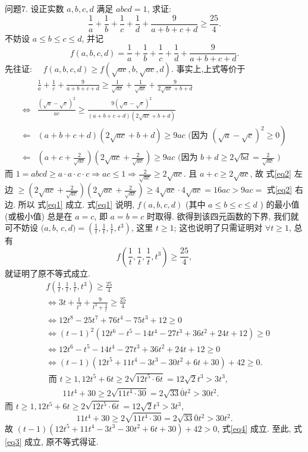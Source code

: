 问题7. 设正实数 $a, b, c, d$ 满足 $a b c d=1$, 求证:
$$
\frac{1}{a}+\frac{1}{b}+\frac{1}{c}+\frac{1}{d}+\frac{9}{a+b+c+d} \geqslant \frac{25}{4} .
$$
不妨设 $a \leqslant b \leqslant c \leqslant d$, 并记
$$
f(a, b, c, d)=\frac{1}{a}+\frac{1}{b}+\frac{1}{c}+\frac{1}{d}+\frac{9}{a+b+c+d} .
$$
先往证: $\quad f(a, b, c, d) \geqslant f(\sqrt{a c}, b, \sqrt{a c}, d)$. \label{eq1}
事实上,上式等价于
$$
\begin{aligned}
& \frac{1}{a}+\frac{1}{c}+\frac{9}{a+b+c+d} \geqslant \frac{1}{\sqrt{a c}}+\frac{1}{\sqrt{a c}}+\frac{9}{2 \sqrt{a c}+b+d} \\
\Leftrightarrow & \frac{(\sqrt{a}-\sqrt{c})^2}{a c} \geqslant \frac{9(\sqrt{a}-\sqrt{c})^2}{(a+b+c+d)(2 \sqrt{a c}+b+d)} \\
\Leftarrow & \left.(a+b+c+d)(2 \sqrt{a c}+b+d) \geqslant 9 a c \text { (因为 }(\sqrt{a}-\sqrt{c})^2 \geqslant 0\right) \\
\Leftarrow & \left(a+c+\frac{2}{\sqrt{a c}}\right)\left(2 \sqrt{a c}+\frac{2}{\sqrt{a c}}\right) \geqslant 9 a c \text { (因为 } b+d \geqslant 2 \sqrt{b d}=\frac{2}{\sqrt{a c}} \text { ) } \label{eq2}
\end{aligned}
$$
而 $1=a b c d \geqslant a \cdot a \cdot c \cdot c \Rightarrow a c \leqslant 1 \Rightarrow \frac{2}{\sqrt{a c}} \geqslant 2 \sqrt{a c}$. 且 $a+c \geqslant 2 \sqrt{a c}$, 故
式\ref{eq2} 左边 $\geqslant\left(2 \sqrt{a c}+\frac{2}{\sqrt{a c}}\right)\left(2 \sqrt{a c}+\frac{2}{\sqrt{a c}}\right) \geqslant 4 \sqrt{a c} \cdot 4 \sqrt{a c}= 16 a c>9 a c=$ 式\ref{eq2} 右边.
所以 式\ref{eq1} 成立.
式\ref{eq1} 说明, $f(a, b, c, d)$ (其中 $a \leqslant b \leqslant c \leqslant d$ ) 的最小值 (或极小值) 总是在 $a=c$, 即 $a=b=c$ 时取得.
欲得到该四元函数的下界, 我们就可不妨设 $(a, b$, $c, d)=\left(\frac{1}{t}, \frac{1}{t}, \frac{1}{t}, t^3\right)$, 这里 $t \geqslant 1$; 这也说明了只需证明对 $\forall t \geqslant 1$, 总有
$$
f\left(\frac{1}{t}, \frac{1}{t}, \frac{1}{t}, t^3\right) \geqslant \frac{25}{4}, \label{eq3}
$$
就证明了原不等式成立.
$$
\begin{aligned}
& f\left(\frac{1}{t}, \frac{1}{t}, \frac{1}{t}, t^3\right) \geqslant \frac{25}{4} \\
& \Leftrightarrow 3 t+\frac{1}{t^3}+\frac{9}{t^3+\frac{3}{t}} \geqslant \frac{25}{4} \\
& \Leftrightarrow 12 t^8-25 t^7+76 t^4-75 t^3+12 \geqslant 0 \\
& \Leftrightarrow(t-1)^2\left(12 t^6-t^5-14 t^4-27 t^3+36 t^2+24 t+12\right) \geqslant 0 \\
& \Leftrightarrow 12 t^6-t^5-14 t^4-27 t^3+36 t^2+24 t+12 \geqslant 0 \\
& \Leftrightarrow(t-1)\left(12 t^5+11 t^4-3 t^3-30 t^2+6 t+30\right)+42 \geqslant 0 . \label{eq4} \\ 
& \text { 而 } t \geqslant 1,12 t^5+6 t \geqslant 2 \sqrt{12 t^5 \cdot 6 t}=12 \sqrt{2} t^3>3 t^3, \\
& \qquad 11 t^4+30 \geqslant 2 \sqrt{11 t^4 \cdot 30}=2 \sqrt{33} \overline{0} t^2>30 t^2 .
\end{aligned}
$$
而 $t \geqslant 1,12 t^5+6 t \geqslant 2 \sqrt{12 t^5 \cdot 6 t}=12 \sqrt{2} t^3>3 t^3$,
$$
11 t^4+30 \geqslant 2 \sqrt{11 t^4 \cdot 30}=2 \sqrt{33} \overline{0} t^2>30 t^2 .
$$
故 $(t-1)\left(12 t^5+11 t^4-3 t^3-30 t^2+6 t+30\right)+42>0$, 式\ref{eq4} 成立.
至此, 式\ref{eq3} 成立, 原不等式得证.


